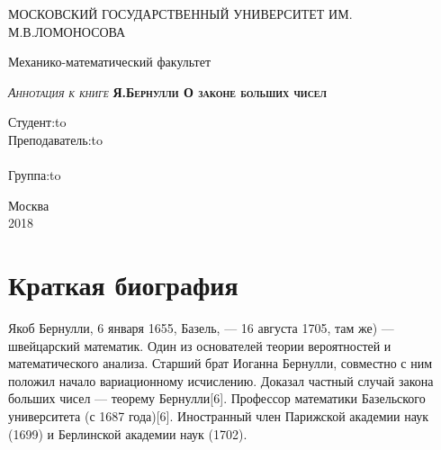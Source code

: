 \documentclass[12pt]{article}
\begin{document}
\renewcommand{\contentsname}{Содержание}

\begin{titlepage} \newpage 
	\begin{center} МОСКОВСКИЙ ГОСУДАРСТВЕННЫЙ УНИВЕРСИТЕТ ИМ. М.В.ЛОМОНОСОВА\\ \end{center} 
	\vspace{3em} 
	\begin{center} \Large Механико-математический факультет \\ \end{center}
	\vspace{5em} 
	\begin{center} 
		\textsc{
			\textit{Аннотация к книге} \linebreak
			\textbf{
				Я.Бернулли \linebreak
				\large{О законе больших чисел}
			}
		}
	\end{center}
	\vspace{6em} \newbox{\lbox}  
	\newlength{\maxl} \setlength{\maxl}{\wd\lbox} \hfill\parbox{8cm}
	{ \hspace*{5cm}\hspace*{-5cm}Студент:\hfill\hbox to\\
	\hspace*{5cm}\hspace*{-5cm}Преподаватель:\hfill\hbox to\\ \\
	\hspace*{5cm}\hspace*{-5cm}Группа:\hfill\hbox to\\ } 
	\vspace{\fill}
	\begin{center} Москва \\ 2018 \end{center} 
\end{titlepage}

\tableofcontents

\newpage
\section{Краткая биография}
Якоб Бернулли, 6 января 1655, Базель, — 16 августа 1705, там же) — швейцарский математик. Один из основателей теории вероятностей и математического анализа. Старший брат Иоганна Бернулли, совместно с ним положил начало вариационному исчислению. Доказал частный случай закона больших чисел — теорему Бернулли[6]. Профессор математики Базельского университета (с 1687 года)[6]. Иностранный член Парижской академии наук (1699) и Берлинской академии наук (1702).
\end{document}
